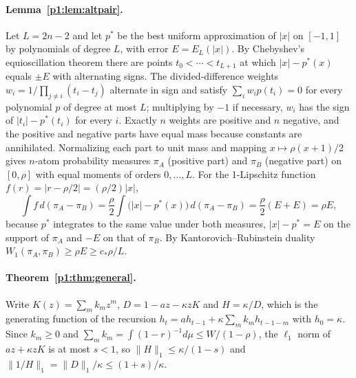 \paragraph{Lemma~\ref{p1:lem:altpair}.} Let $L=2n-2$ and let $p^*$ be the best uniform approximation of $|x|$ on $[-1,1]$ by polynomials of degree $L$, with error $E=E_L(|x|)$. By Chebyshev's equioscillation theorem \citep{p1:rivlin1981} there are points $t_0<\cdots<t_{L+1}$ at which $|x|-p^*(x)$ equals $\pm E$ with alternating signs. The divided-difference weights $w_i=1/\prod_{j\ne i}(t_i-t_j)$ alternate in sign and satisfy $\sum_iw_ip(t_i)=0$ for every polynomial $p$ of degree at most $L$; multiplying by $-1$ if necessary, $w_i$ has the sign of $|t_i|-p^*(t_i)$ for every $i$. Exactly $n$ weights are positive and $n$ negative, and the positive and negative parts have equal mass because constants are annihilated. Normalizing each part to unit mass and mapping $x\mapsto\rho(x+1)/2$ gives $n$-atom probability measures $\pi_A$ (positive part) and $\pi_B$ (negative part) on $[0,\rho]$ with equal moments of orders $0,\ldots,L$. For the 1-Lipschitz function $f(r)=|r-\rho/2|=(\rho/2)|x|$,
\[
\int f\,d(\pi_A-\pi_B)=\frac\rho2\int\bigl(|x|-p^*(x)\bigr)\,d(\pi_A-\pi_B)=\frac\rho2(E+E)=\rho E ,
\]
because $p^*$ integrates to the same value under both measures, $|x|-p^*=E$ on the support of $\pi_A$ and $-E$ on that of $\pi_B$. By Kantorovich--Rubinstein duality $W_1(\pi_A,\pi_B)\ge\rho E\ge c_*\rho/L$.

\paragraph{Theorem~\ref{p1:thm:general}.} Write $K(z)=\sum_mk_mz^m$, $D=1-az-\kappa zK$ and $H=\kappa/D$, which is the generating function of the recursion $h_t=ah_{t-1}+\kappa\sum_mk_mh_{t-1-m}$ with $h_0=\kappa$. Since $k_m\ge0$ and $\sum_mk_m=\int(1-r)^{-1}d\mu\le W/(1-\rho)$, the $\ell_1$ norm of $az+\kappa zK$ is at most $s<1$, so $\|H\|_1\le\kappa/(1-s)$ and $\|1/H\|_1=\|D\|_1/\kappa\le(1+s)/\kappa$.

